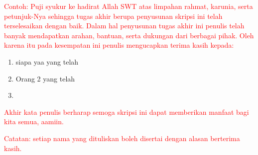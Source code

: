 \textcolor{red}{
Contoh: Puji syukur ke hadirat Allah SWT atas limpahan rahmat, karunia, serta petunjuk-Nya sehingga tugas akhir berupa penyusunan skripsi ini telah terselesaikan dengan baik. Dalam hal penyusunan tugas akhir ini penulis telah banyak mendapatkan arahan, bantuan, serta dukungan dari berbagai pihak. Oleh karena itu pada kesempatan ini penulis mengucapkan terima kasih kepada:}


\begin{enumerate}
	\item siapa yaa yang telah
	
	\item Orang 2 yang telah
		
	\item <isi dengan nama orang lainnya>

\end{enumerate}

\textcolor{red}{Akhir kata penulis berharap semoga skripsi ini dapat memberikan manfaat bagi kita semua, aamiin.}

\noindent\textcolor{red}{Catatan: setiap nama yang dituliskan boleh disertai dengan alasan berterima kasih.}

